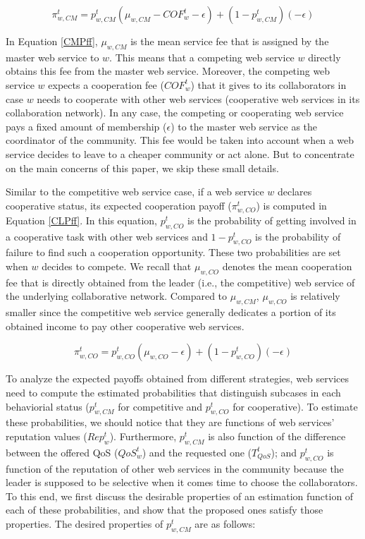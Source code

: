 \documentclass[runningheads,a4paper]{llncs}
\begin{document}
\begin{equation}\label{CMPff}
\pi_{w,CM}^t=p_{w,CM}^t(\mu_{w,
CM}-COF_w^t-\epsilon)+(1-p_{w,CM}^t)(-\epsilon)
\end{equation}

In Equation \ref{CMPff}, $\mu_{w, CM}$ is the mean service fee
that is assigned by the master web service to $w$. This means that
a competing web service $w$ directly obtains this fee from the
master web service. Moreover, the competing web service $w$
expects a cooperation fee ($COF_w^t$) that it gives to its
collaborators in case $w$ needs to cooperate with other web
services (cooperative web services in its collaboration network).
In any case, the competing or cooperating web service pays a fixed
amount of membership ($\epsilon$) to the master web service as the
coordinator of the community. This fee would be taken into account
when a web service decides to leave to a cheaper community or act
alone. But to concentrate on the main concerns of this paper, we
skip these small details.


Similar to the competitive web service case, if a web service $w$
declares cooperative status, its expected cooperation payoff
($\pi_{w,CO}^t$) is computed in Equation \ref{CLPff}. In this
equation, $p_{w,CO}^t$ is the probability of getting involved in a
cooperative task with other web services and $1-p_{w,CO}^t$ is the
probability of failure to find such a cooperation opportunity.
These two probabilities are set when $w$ decides to compete. We
recall that $\mu_{w, CO}$ denotes the mean cooperation fee that is
directly obtained from the leader (i.e., the competitive) web
service of the underlying collaborative network. Compared to
$\mu_{w, CM}$, $\mu_{w, CO}$ is relatively smaller since the
competitive web service generally dedicates a portion of its
obtained income to pay other cooperative web services.


\begin{equation}\label{CLPff}
\pi_{w,CO}^t=p_{w,CO}^t (\mu_{w,
CO}-\epsilon)+(1-p_{w,CO}^t)(-\epsilon)
\end{equation}


To analyze the expected payoffs obtained from different
strategies, web services need to compute the estimated
probabilities that distinguish subcases in each behaviorial status
($p_{w,CM}^t$ for competitive and $p_{w,CO}^t$ for cooperative).
To estimate these probabilities, we should notice that they are
functions of web services' reputation values ($Rep_w^t$).
Furthermore, $p_{w,CM}^t$ is also function of the difference
between the offered QoS ($QoS_w^t$) and the requested one
($T_{QoS}^t$); and $p_{w,CO}^t$ is function of the reputation of
other web services in the community because the leader is supposed
to be selective when it comes time to choose the collaborators. To
this end, we first discuss the desirable properties of an
estimation function of each of these probabilities, and show that
the proposed ones satisfy those properties. The desired properties
of $p_{w,CM}^t$ are as follows:
\end{document}
